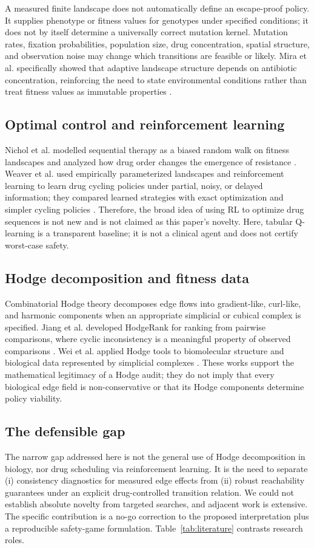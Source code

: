 \documentclass[11pt]{article}
\theoremstyle{definition}\newtheorem{definition}[proposition]{Definition}\theoremstyle{remark}\newtheorem{remark}[proposition]{Remark}
\begin{document}
A measured finite landscape does not automatically define an escape-proof policy. It supplies phenotype or fitness values for genotypes under specified conditions; it does not by itself determine a universally correct mutation kernel. Mutation rates, fixation probabilities, population size, drug concentration, spatial structure, and observation noise may change which transitions are feasible or likely. Mira et al. specifically showed that adaptive landscape structure depends on antibiotic concentration, reinforcing the need to state environmental conditions rather than treat fitness values as immutable properties \citep{Mira2015}.

\subsection{Optimal control and reinforcement learning}
Nichol et al. modelled sequential therapy as a biased random walk on fitness landscapes and analyzed how drug order changes the emergence of resistance \citep{Nichol2015}. Weaver et al. used empirically parameterized landscapes and reinforcement learning to learn drug cycling policies under partial, noisy, or delayed information; they compared learned strategies with exact optimization and simpler cycling policies \citep{Weaver2024}. Therefore, the broad idea of using RL to optimize drug sequences is not new and is not claimed as this paper's novelty. Here, tabular Q-learning is a transparent baseline; it is not a clinical agent and does not certify worst-case safety.

\subsection{Hodge decomposition and fitness data}
Combinatorial Hodge theory decomposes edge flows into gradient-like, curl-like, and harmonic components when an appropriate simplicial or cubical complex is specified. Jiang et al. developed HodgeRank for ranking from pairwise comparisons, where cyclic inconsistency is a meaningful property of observed comparisons \citep{Jiang2011}. Wei et al. applied Hodge tools to biomolecular structure and biological data represented by simplicial complexes \citep{Koh2022}. These works support the mathematical legitimacy of a Hodge audit; they do not imply that every biological edge field is non-conservative or that its Hodge components determine policy viability.

\subsection{The defensible gap}
The narrow gap addressed here is not the general use of Hodge decomposition in biology, nor drug scheduling via reinforcement learning. It is the need to separate (i) consistency diagnostics for measured edge effects from (ii) robust reachability guarantees under an explicit drug-controlled transition relation. We could not establish absolute novelty from targeted searches, and adjacent work is extensive. The specific contribution is a no-go correction to the proposed interpretation plus a reproducible safety-game formulation. Table~\ref{tab:literature} contrasts research roles.
\end{document}
